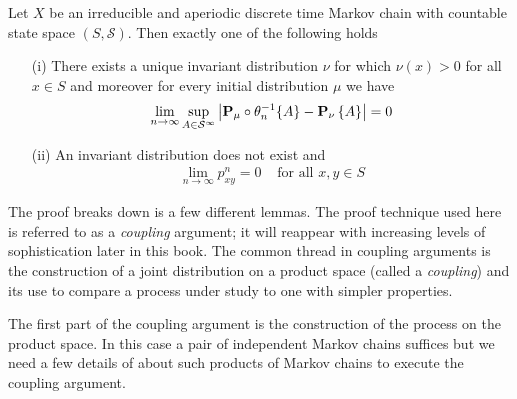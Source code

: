 \begin{thm}\label{ErgodicTheoremDiscreteTimeMarkovChains}Let $X$ be an
  irreducible and aperiodic discrete time Markov chain with countable state
  space $(S, \mathcal{S})$.  Then exactly
  one of the following holds
\begin{itemize}
\item[(i)]There exists a unique invariant distribution $\nu$ for which
  $\nu(x) > 0$ for all $x \in S$ and moreover for every initial
  distribution $\mu$ we have
\begin{align}
\lim_{n \to \infty} \sup_{A \in \mathcal{S}^\infty}
  \abs{\pushforward{\theta_n}{\probabilityop_\mu}\lbrace A \rbrace -
  \sprobability{A}{\nu}} = 0
\end{align}\label{ConvergenceToInvariantDiscreteTimeMarkovChain}
\item[(ii)]An invariant distribution does not exist and 
\begin{align*}
\lim_{n \to \infty} p^n_{xy} = 0 & \text{ for all $x,y \in S$}
\end{align*}
\end{itemize}
\end{thm}
The proof breaks down is a few different lemmas.  The proof technique used here is referred to as a
\emph{coupling} argument; it will reappear with increasing levels of
sophistication later in this book.  The common thread in coupling
arguments is the construction of a joint distribution on a product
space (called a \emph{coupling}) and its use to compare a process under study to one with simpler properties.

The first part of the coupling argument is the construction of the
process on the product space.  In this case a pair of independent
Markov chains suffices but we need a few details of about such
products of Markov chains to execute the coupling argument.

